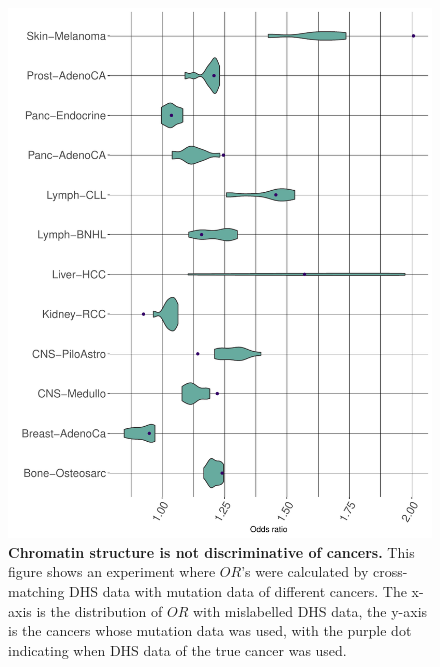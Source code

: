 \begin{figure}[h!]
    \centering
    \includegraphics[scale=0.66]{graphics/mixed_or_violin_by_row.pdf}
    \caption{\textbf{Chromatin structure is not discriminative of cancers.} This figure shows an experiment where $OR$'s were calculated by cross-matching DHS data with mutation data of different cancers. The x-axis is the distribution of $OR$ with mislabelled DHS data, the y-axis is the cancers whose mutation data was used, with the purple dot indicating when DHS data of the true cancer was used.}
    \label{fig:mixed_or_byrow}
\end{figure}
